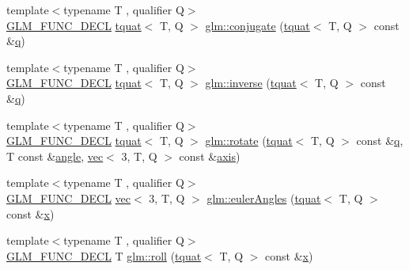 \begin{DoxyCompactItemize}
\item 
{\footnotesize template$<$typename T , qualifier Q$>$ }\\\hyperlink{setup_8hpp_ab2d052de21a70539923e9bcbf6e83a51}{G\+L\+M\+\_\+\+F\+U\+N\+C\+\_\+\+D\+E\+CL} \hyperlink{structglm_1_1tquat}{tquat}$<$ T, Q $>$ \hyperlink{group__gtc__quaternion_gac40833db608deda477f018767b9a1cad}{glm\+::conjugate} (\hyperlink{structglm_1_1tquat}{tquat}$<$ T, Q $>$ const \&\hyperlink{_s_d_l__opengl_8h_a8fc1e7b9baaae687804c7eed46ca09c6}{q})
\item 
{\footnotesize template$<$typename T , qualifier Q$>$ }\\\hyperlink{setup_8hpp_ab2d052de21a70539923e9bcbf6e83a51}{G\+L\+M\+\_\+\+F\+U\+N\+C\+\_\+\+D\+E\+CL} \hyperlink{structglm_1_1tquat}{tquat}$<$ T, Q $>$ \hyperlink{group__gtc__quaternion_gadc59b59ce71daa5586a64a6acf36c072}{glm\+::inverse} (\hyperlink{structglm_1_1tquat}{tquat}$<$ T, Q $>$ const \&\hyperlink{_s_d_l__opengl_8h_a8fc1e7b9baaae687804c7eed46ca09c6}{q})
\item 
{\footnotesize template$<$typename T , qualifier Q$>$ }\\\hyperlink{setup_8hpp_ab2d052de21a70539923e9bcbf6e83a51}{G\+L\+M\+\_\+\+F\+U\+N\+C\+\_\+\+D\+E\+CL} \hyperlink{structglm_1_1tquat}{tquat}$<$ T, Q $>$ \hyperlink{group__gtc__quaternion_ga21c6e3b6104c9b8116a35ddf2ac4d358}{glm\+::rotate} (\hyperlink{structglm_1_1tquat}{tquat}$<$ T, Q $>$ const \&\hyperlink{_s_d_l__opengl_8h_a8fc1e7b9baaae687804c7eed46ca09c6}{q}, T const \&\hyperlink{_s_d_l__opengl__glext_8h_a9e06c1f76a20fed54ca742cd25cb02c4}{angle}, \hyperlink{structglm_1_1vec}{vec}$<$ 3, T, Q $>$ const \&\hyperlink{group__gtc__quaternion_gaaf2707d3081789ce097daaa6e54d5287}{axis})
\item 
{\footnotesize template$<$typename T , qualifier Q$>$ }\\\hyperlink{setup_8hpp_ab2d052de21a70539923e9bcbf6e83a51}{G\+L\+M\+\_\+\+F\+U\+N\+C\+\_\+\+D\+E\+CL} \hyperlink{structglm_1_1vec}{vec}$<$ 3, T, Q $>$ \hyperlink{group__gtc__quaternion_gaf21424fa62e03de8b11c2b776c17d7a3}{glm\+::euler\+Angles} (\hyperlink{structglm_1_1tquat}{tquat}$<$ T, Q $>$ const \&\hyperlink{_s_d_l__opengl_8h_ad0e63d0edcdbd3d79554076bf309fd47}{x})
\item 
{\footnotesize template$<$typename T , qualifier Q$>$ }\\\hyperlink{setup_8hpp_ab2d052de21a70539923e9bcbf6e83a51}{G\+L\+M\+\_\+\+F\+U\+N\+C\+\_\+\+D\+E\+CL} T \hyperlink{group__gtc__quaternion_ga3ff93afbd9cc29f2ad217f2228e8a95b}{glm\+::roll} (\hyperlink{structglm_1_1tquat}{tquat}$<$ T, Q $>$ const \&\hyperlink{_s_d_l__opengl_8h_ad0e63d0edcdbd3d79554076bf309fd47}{x})

\end{DoxyCompactItemize}
